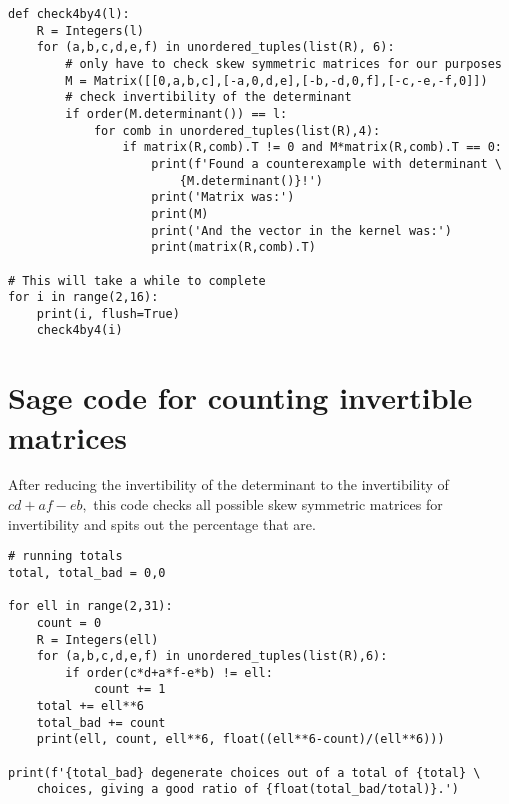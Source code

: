 \documentclass [11pt, proquest] {uwthesis}[2020/02/24]
\begin{document}
\begin{verbatim}
def check4by4(l):
    R = Integers(l)
    for (a,b,c,d,e,f) in unordered_tuples(list(R), 6):
        # only have to check skew symmetric matrices for our purposes
        M = Matrix([[0,a,b,c],[-a,0,d,e],[-b,-d,0,f],[-c,-e,-f,0]])
        # check invertibility of the determinant
        if order(M.determinant()) == l:
            for comb in unordered_tuples(list(R),4):
                if matrix(R,comb).T != 0 and M*matrix(R,comb).T == 0:
                    print(f'Found a counterexample with determinant \
                        {M.determinant()}!')
                    print('Matrix was:')
                    print(M)
                    print('And the vector in the kernel was:')
                    print(matrix(R,comb).T)

# This will take a while to complete
for i in range(2,16):
    print(i, flush=True)
    check4by4(i)
\end{verbatim}

\section{Sage code for counting invertible matrices}\label{code:sage-number-invertible}
After reducing the invertibility of the determinant to the invertibility of $cd+af-eb,$ this code checks all possible skew symmetric matrices for invertibility and spits out the percentage that are.

\begin{verbatim}
# running totals
total, total_bad = 0,0

for ell in range(2,31):
    count = 0
    R = Integers(ell)
    for (a,b,c,d,e,f) in unordered_tuples(list(R),6):
        if order(c*d+a*f-e*b) != ell:
            count += 1
    total += ell**6
    total_bad += count
    print(ell, count, ell**6, float((ell**6-count)/(ell**6)))

print(f'{total_bad} degenerate choices out of a total of {total} \
    choices, giving a good ratio of {float(total_bad/total)}.')
\end{verbatim}

\end{document}
